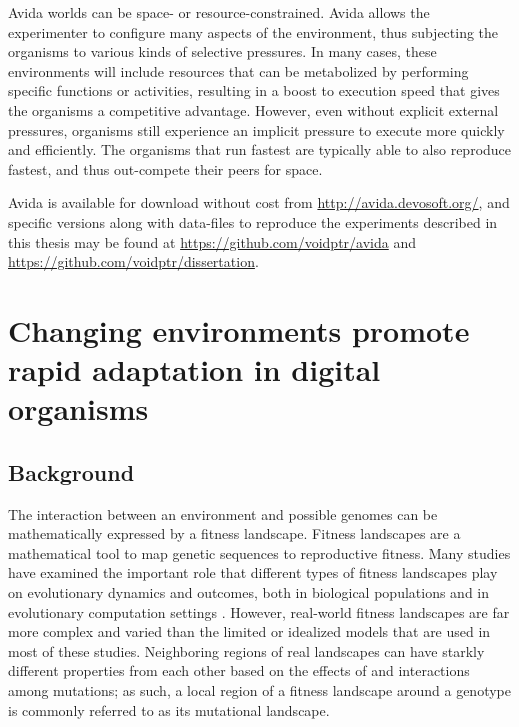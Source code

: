 \documentclass[PhD]{msu-thesis}
\begin{document}
Avida worlds can be space- or resource-constrained. Avida allows the experimenter to configure many aspects of the environment, thus subjecting the organisms to various kinds of selective pressures.  In many cases, these environments will include resources that can be metabolized by performing specific functions or activities, resulting in a boost to execution speed that gives the organisms a competitive advantage. However, even without explicit external pressures, organisms still experience an implicit pressure to execute more quickly and efficiently. The organisms that run fastest are typically able to also reproduce fastest, and thus out-compete their peers for space.

Avida is available for download without cost from \url{http://avida.devosoft.org/}, and specific versions along with data-files to reproduce the experiments described in this thesis may be found at \url{https://github.com/voidptr/avida} and \url{https://github.com/voidptr/dissertation}.



\chapter{Changing environments promote rapid adaptation in digital organisms}
\label{chap:ce-adaptation}

\section{Background}
The interaction between an environment and possible genomes can be mathematically expressed by a fitness landscape.
Fitness landscapes are a mathematical tool to map genetic sequences to reproductive fitness. Many studies have examined the important role that different types of fitness landscapes play on evolutionary dynamics and outcomes, both in biological populations \cite{khan_negative_2011,szendro_quantitative_2013,weinreich_darwinian_2006,nahum_tortoisehare_2015} and in evolutionary computation settings \cite{merz_fitness_2000,humeau_paradiseo-mo:_2013,kallel_theoretical_2013}. However, real-world fitness landscapes are far more complex and varied than the limited or idealized models that are used in most of these studies. Neighboring regions of real landscapes can have starkly different properties from each other based on the effects of and interactions among mutations; as such, a local region of a fitness landscape around a genotype is commonly referred to as its mutational landscape.%
\end{document}
